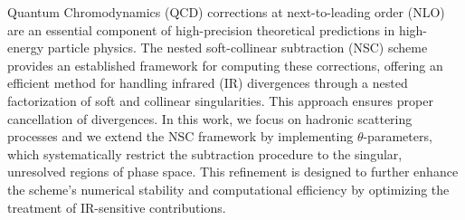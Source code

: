 
Quantum Chromodynamics (QCD) corrections at next-to-leading order (NLO) are an essential component of high-precision theoretical predictions in high-energy particle physics. The nested soft-collinear subtraction (NSC) scheme provides an established framework for computing these corrections, offering an efficient method for handling infrared (IR) divergences through a nested factorization of soft and collinear singularities. This approach ensures proper cancellation of divergences.
In this work, we focus on hadronic scattering processes and we extend the NSC framework by implementing $\theta$-parameters, which systematically restrict the subtraction procedure to the singular, unresolved regions of phase space. This refinement is designed to further enhance the scheme's numerical stability and computational efficiency by optimizing the treatment of IR-sensitive contributions.
